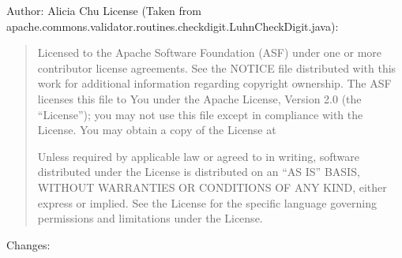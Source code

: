 \documentclass[letterpaper,10pt,english]{sphinxmanual}
\begin{document}
\sphinxAtStartPar
Author: Alicia Chu
License (Taken from apache.commons.validator.routines.checkdigit.LuhnCheckDigit.java):
\begin{quote}

\sphinxAtStartPar
Licensed to the Apache Software Foundation (ASF) under one or more
contributor license agreements. See the NOTICE file distributed with
this work for additional information regarding copyright ownership.
The ASF licenses this file to You under the Apache License, Version 2.0
(the “License”); you may not use this file except in compliance with
the License. You may obtain a copy of the License at
\begin{quote}

\sphinxAtStartPar
{}
\end{quote}

\sphinxAtStartPar
Unless required by applicable law or agreed to in writing, software
distributed under the License is distributed on an “AS IS” BASIS,
WITHOUT WARRANTIES OR CONDITIONS OF ANY KIND, either express or implied.
See the License for the specific language governing permissions and
limitations under the License.
\end{quote}

\sphinxAtStartPar
Changes:
\end{document}
